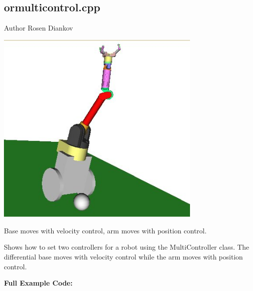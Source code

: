 \hypertarget{ormulticontrol.cpp-example}{
\subsection{ormulticontrol.cpp}
}
\begin{DoxyAuthor}{Author}
Rosen Diankov
\end{DoxyAuthor}
 
\begin{DoxyImage}
\includegraphics[width=10cm]{cppexample_ormulticontrol.jpg}
\caption{Base moves with velocity control, arm moves with position control.}
\end{DoxyImage}


Shows how to set two controllers for a robot using the MultiController class. The differential base moves with velocity control while the arm moves with position control.

{\bfseries Full Example Code:}


